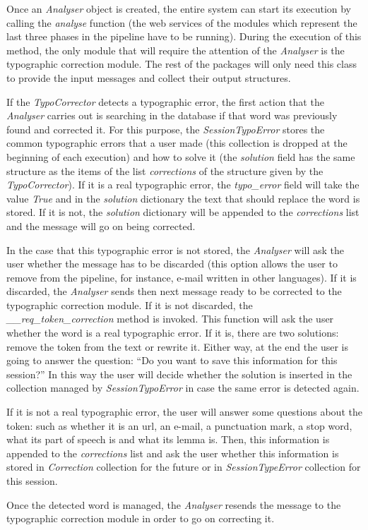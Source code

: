 Once an \textit{Analyser} object is created, the entire system can start its execution by calling the \textit{analyse} function (the web services of the modules which represent the last three phases in the pipeline have to be running). During the execution of this method, the only module that will require the attention of the \textit{Analyser} is the typographic correction module. The rest of the packages will only need this class to provide the input messages and collect their output structures.

If the \textit{TypoCorrector} detects a typographic error, the first action that the \textit{Analyser} carries out is searching in the database if that word was previously found and corrected it. For this purpose, the \textit{SessionTypoError} stores the common typographic errors that a user made (this collection is dropped at the beginning of each execution) and how to solve it (the \textit{solution} field has the same structure as the items of the list \textit{corrections} of the structure given by the \textit{TypoCorrector}). If it is a real typographic error, the \textit{typo\_error} field will take the value \textit{True} and in the \textit{solution} dictionary the text that should replace the word is stored. If it is not, the \textit{solution} dictionary will be appended to the \textit{corrections} list and the message will go on being corrected.

In the case that this typographic error is not stored, the \textit{Analyser} will ask the user whether the message has to be discarded (this option allows the user to remove from the pipeline, for instance, e-mail written in other languages). If it is discarded, the \textit{Analyser} sends then next message ready to be corrected to the typographic correction module. If it is not discarded, the \textit{\_\_req\_token\_correction} method is invoked. This function will ask the user whether the word is a real typographic error. If it is, there are two solutions: remove the token from the text or rewrite it. Either way, at the end the user is going to answer the question: ``Do you want to save this information for this session?'' In this way the user will decide whether the solution is inserted in the collection managed by \textit{SessionTypoError} in case the same error is detected again.

If it is not a real typographic error, the user will answer some questions about the token: such as whether it is an url, an e-mail, a punctuation mark, a stop word, what its part of speech is and what its lemma is. Then, this information is appended to the \textit{corrections} list and ask the user whether this information is stored in \textit{Correction} collection for the future or in \textit{SessionTypeError} collection for this session.

Once the detected word is managed, the \textit{Analyser} resends the message to the typographic correction module in order to go on correcting it.

